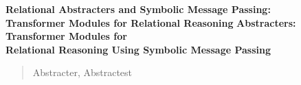 \documentclass[12pt,pdftex,noinfoline]{imsart}
\numberwithin{equation}{section}
\theoremstyle{remark}
\begin{document}
\setlength{\parskip}{0.5em}
\begin{frontmatter}
{\bf\Large Relational Abstracters and Symbolic Message Passing: \\[7pt] Transformer Modules for Relational Reasoning}
\vskip10pt
{\bf\Large Abstracters: Transformer Modules for \\[7pt] Relational Reasoning Using Symbolic Message Passing}
\begin{abstract}
    Abstracter, Abstractest
\end{abstract}
\end{frontmatter}




\setlength{\bibsep}{8pt plus 0.3ex}

%
\end{document}

